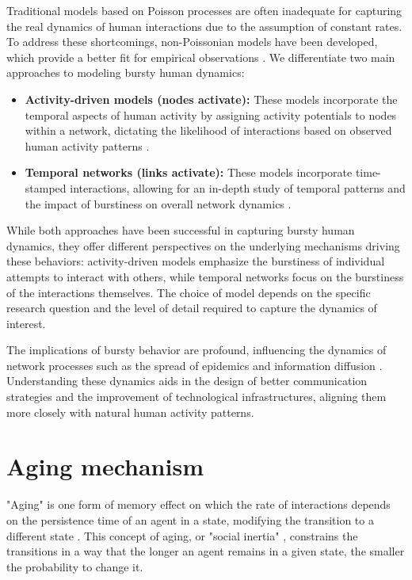 Traditional models based on Poisson processes are often inadequate for capturing the real dynamics of human interactions due to the assumption of constant rates. To address these shortcomings, non-Poissonian models have been developed, which provide a better fit for empirical observations \cite{Vazquez2006Bursts}. We differentiate two main approaches to modeling bursty human dynamics:

\begin{itemize}
    \item \textbf{Activity-driven models (nodes activate):} These models incorporate the temporal aspects of human activity by assigning activity potentials to nodes within a network, dictating the likelihood of interactions based on observed human activity patterns \cite{Perra2012ActivityDriven}.
    \item \textbf{Temporal networks (links activate):} These models incorporate time-stamped interactions, allowing for an in-depth study of temporal patterns and the impact of burstiness on overall network dynamics \cite{Holme2012Temporal}.
\end{itemize}

While both approaches have been successful in capturing bursty human dynamics, they offer different perspectives on the underlying mechanisms driving these behaviors: activity-driven models emphasize the burstiness of individual attempts to interact with others, while temporal networks focus on the burstiness of the interactions themselves. The choice of model depends on the specific research question and the level of detail required to capture the dynamics of interest.

The implications of bursty behavior are profound, influencing the dynamics of network processes such as the spread of epidemics and information diffusion \cite{Rocha2013Bursts, Wang2009Viruses}. Understanding these dynamics aids in the design of better communication strategies and the improvement of technological infrastructures, aligning them more closely with natural human activity patterns.

\section{\label{sec:Aging mechanism} Aging mechanism}

"Aging" is one form of memory effect on which the rate of interactions depends on the persistence time of an agent in a state, modifying the transition to a different state \cite{fernandez-gracia-2011,perez-2016,boguna-2014}. This concept of aging, or "social inertia" \cite{Stark2008}, constrains the transitions in a way that the longer an agent remains in a given state, the smaller the probability to change it.

